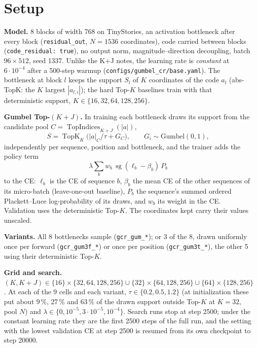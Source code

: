 \documentclass[11pt,a4paper]{article}
\newcommand{\code}[1]{\texttt{#1}}
\newcommand{\TopK}{\operatorname{TopK}}
\newcommand{\sg}{\operatorname{sg}}
\begin{document}
\section{Setup}\label{sec:setup}

\textbf{Model.} 8 blocks of width 768 on TinyStories, an activation bottleneck
after every block (\code{residual\_out}, $N = 1536$ coordinates), code carried
between blocks (\code{code\_residual: true}), no output norm, magnitude--direction
decoupling, batch $96 \times 512$, seed 1337. Unlike the K+J notes, the learning
rate is \emph{constant} at $6\cdot10^{-4}$ after a 500-step warmup
(\code{configs/gumbel\_cr/base.yaml}). The bottleneck at block $l$ keeps the
support $S_l$ of $K$ coordinates of the code $a_l$ (abs-TopK: the $K$ largest
$|a_{l,i}|$); the hard Top-$K$ baselines train with that deterministic support,
$K \in \{16, 32, 64, 128, 256\}$.

\textbf{Gumbel Top-$(K{+}J)$.} In training each bottleneck draws its support
from the candidate pool $C = \operatorname{TopIndices}_{K+J}(|a|)$,
\begin{equation}
  S = \TopK_K\!\big(|a|_C/\tau + G_C\big), \qquad G_i \sim \mathrm{Gumbel}(0,1),
\end{equation}
independently per sequence, position and bottleneck, and the trainer adds the
policy term
\begin{equation}
  \lambda \textstyle\sum_b w_b\, \sg(\ell_b - \beta_b)\, P_b
\end{equation}
to the CE: $\ell_b$ is the CE of sequence $b$, $\beta_b$ the mean CE of the other
sequences of its micro-batch (leave-one-out baseline), $P_b$ the sequence's
summed ordered Plackett--Luce log-probability of its draws, and $w_b$ its weight
in the CE. Validation uses the deterministic Top-$K$. The coordinates kept carry
their values unscaled.

\textbf{Variants.} All 8 bottlenecks sample (\code{gcr\_gum\_*}); or 3 of the 8,
drawn uniformly once per forward (\code{gcr\_gum3f\_*}) or once per position
(\code{gcr\_gum3t\_*}), the other 5 using their deterministic Top-$K$.

\textbf{Grid and search.} $(K, K{+}J) \in \{16\}\times\{32,64,128,256\} \cup
\{32\}\times\{64,128,256\} \cup \{64\}\times\{128,256\}$. At each of the 9
cells and each variant, $\tau \in \{0.2, 0.5, 1.2\}$ (at initialization these
put about 9\,\%, 27\,\% and 63\,\% of the drawn support outside Top-$K$ at
$K = 32$, pool $N$) and $\lambda \in \{0, 10^{-5}, 3\cdot10^{-5}, 10^{-4}\}$.
Search runs stop at step 2500; under the constant learning rate they are the
first 2500 steps of the full run, and the setting with the lowest validation CE
at step 2500 is resumed from its own checkpoint to step 20000.
\end{document}
